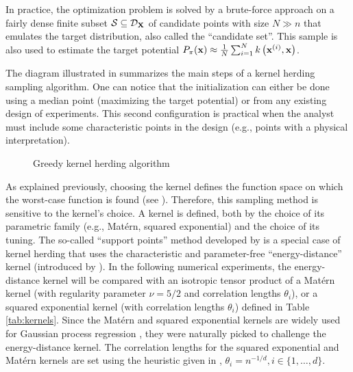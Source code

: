 \begin{remark}
In practice, the optimization problem is solved by a brute-force approach on a fairly dense finite subset $\mathcal{S}\subseteq\mathcal{D}_{{\bf X}}$ of candidate points with size $N \gg n$ that emulates the target distribution, also called the ``candidate set''. 
This sample is also used to estimate the target potential $P_\pi({\bf x}) \approx \frac1N \sum_{i=1}^N k\left({\bf x}^{(i)}, {\bf x}\right)$.
\end{remark}
\medskip

The diagram illustrated in  summarizes the main steps of a kernel herding sampling algorithm. 
One can notice that the initialization can either be done using a median point (maximizing the target potential) or from any existing design of experiments. 
This second configuration is practical when the analyst must include some characteristic points in the design (e.g., points with a physical interpretation). 

\begin{figure}
    \centering
    
    \caption{Greedy kernel herding algorithm}
    \label{fig:kh_algo}
\end{figure}

As explained previously, choosing the kernel defines the function space on which the worst-case function is found (see ). 
Therefore, this sampling method is sensitive to the kernel's choice. 
A kernel is defined, both by the choice of its parametric family (e.g., Matérn, squared exponential) and the choice of its tuning. 
The so-called ``support points'' method developed by \cite{mak_joseph_2018} is a special case of kernel herding that uses the characteristic and parameter-free ``energy-distance'' kernel (introduced by \cite{szekely_rizzo_2013}). 
In the following numerical experiments, the energy-distance kernel will be compared with an isotropic tensor product of a Matérn kernel (with regularity parameter $\nu = 5/2$ and correlation lengths $\theta_i$), or a squared exponential kernel (with correlation lengths $\theta_i$) defined in Table \ref{tab:kernels}. 
Since the Matérn and squared exponential kernels are widely used for Gaussian process regression \citep{rasmussen_2006}, they were naturally picked to challenge the energy-distance kernel. 
The correlation lengths for the squared exponential and Matérn kernels are set using the heuristic given in \cite{fekhari_iooss_2023}, $\theta_i = n^{-1/d}, i \in \{1, \dots, d\}$. 

